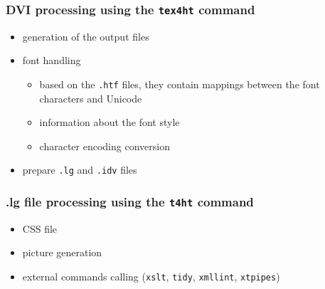 \begin{frame}
  \frametitle{DVI processing using the \texttt{tex4ht} command}
  \begin{itemize}
    \item   generation of the output files
    \item   font handling 
      \begin{itemize}
        \item based on the \texttt{.htf} files, they contain mappings between the font characters and Unicode 
        \item information about the font style
        \item character encoding conversion
      \end{itemize}
    \item prepare \texttt{.lg} and \texttt{.idv} files

  \end{itemize}
\end{frame}

\begin{frame}
  \frametitle{.lg file processing using the \texttt{t4ht} command}
  \begin{itemize}
    \item   CSS file
    \item   picture generation
    \item   external commands calling
    (\texttt{xslt}, \texttt{tidy}, \texttt{xmllint}, \texttt{xtpipes})
  \end{itemize}
\end{frame}

